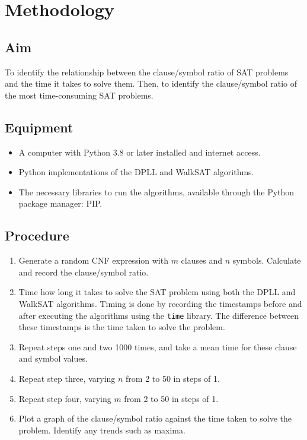 \documentclass{article}
\begin{document}
    \section{Methodology}

    \subsection{Aim}
    To identify the relationship between the clause/symbol ratio of SAT problems and the time it takes to solve them. Then, to identify the clause/symbol ratio of the most time-consuming SAT problems.

    \subsection{Equipment}
    \begin{itemize}
        \item A computer with Python 3.8\supercite{python-lang} or later installed and internet access.
        \item Python implementations of the DPLL and WalkSAT algorithms.
        \item The necessary libraries to run the algorithms, available through the Python package manager: PIP.
    \end{itemize}

    \subsection{Procedure}
    \begin{enumerate}
        \item Generate a random CNF expression with $m$ clauses and $n$ symbols. Calculate and record the clause/symbol ratio.
        \item Time how long it takes to solve the SAT problem using both the DPLL and WalkSAT algorithms. Timing is done by recording the timestamps before and after executing the algorithms using the \texttt{time} library. The difference between these timestamps is the time taken to solve the problem.
        \item Repeat steps one and two 1000 times, and take a mean time for these clause and symbol values.
        \item Repeat step three, varying $n$ from 2 to 50 in steps of 1.
        \item Repeat step four, varying $m$ from 2 to 50 in steps of 1.
        \item Plot a graph of the clause/symbol ratio against the time taken to solve the problem. Identify any trends such as maxima.
    \end{enumerate}
\end{document}
